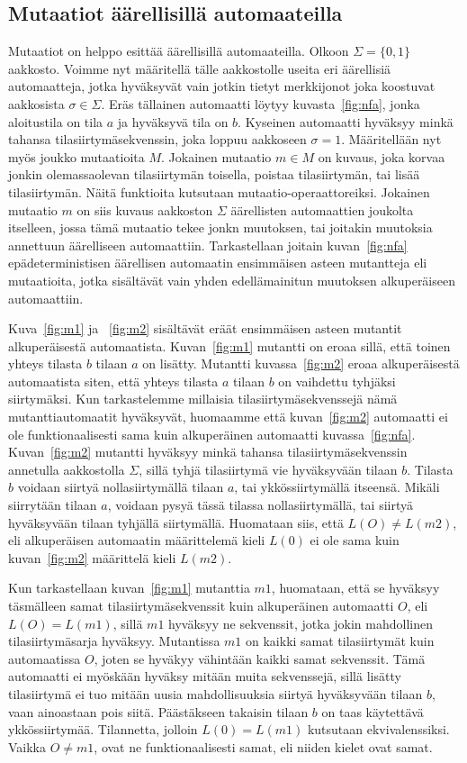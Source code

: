 \documentclass{tktltiki}
\begin{document}
\subsection{Mutaatiot äärellisillä automaateilla}
Mutaatiot on helppo esittää äärellisillä automaateilla. Olkoon $\Sigma=\{0,1\}$ aakkosto. Voimme nyt määritellä tälle aakkostolle useita eri äärellisiä automaatteja, jotka hyväksyvät vain jotkin tietyt merkkijonot joka koostuvat aakkosista $\sigma \in \Sigma$. Eräs tällainen automaatti löytyy kuvasta~\ref{fig:nfa}, jonka aloitustila on tila $a$ ja hyväksyvä tila on $b$. Kyseinen automaatti hyväksyy minkä tahansa tilasiirtymäsekvenssin, joka loppuu aakkoseen $\sigma = 1$. Määritellään nyt myös joukko mutaatioita $M$. Jokainen mutaatio $m\in M$ on kuvaus, joka korvaa jonkin olemassaolevan tilasiirtymän toisella, poistaa tilasiirtymän, tai lisää tilasiirtymän. Näitä funktioita kutsutaan mutaatio-operaattoreiksi. Jokainen mutaatio $m$ on siis kuvaus aakkoston $\Sigma$ äärellisten automaattien joukolta itselleen, jossa tämä mutaatio tekee jonkn muutoksen, tai joitakin muutoksia annettuun äärelliseen automaattiin. Tarkastellaan joitain kuvan~\ref{fig:nfa} epädeterministisen äärellisen automaatin ensimmäisen asteen mutantteja eli mutaatioita, jotka sisältävät vain yhden edellämainitun muutoksen alkuperäiseen automaattiin. 

Kuva~\ref{fig:m1} ja ~\ref{fig:m2} sisältävät eräät ensimmäisen asteen mutantit alkuperäisestä automaatista. Kuvan~\ref{fig:m1} mutantti on eroaa sillä, että toinen yhteys tilasta $b$ tilaan $a$ on lisätty. Mutantti kuvassa~\ref{fig:m2} eroaa alkuperäisestä automaatista siten, että yhteys tilasta $a$ tilaan $b$ on vaihdettu tyhjäksi siirtymäksi. Kun tarkastelemme millaisia tilasiirtymäsekvenssejä nämä mutanttiautomaatit hyväksyvät, huomaamme että kuvan~\ref{fig:m2} automaatti ei ole funktionaalisesti sama kuin alkuperäinen automaatti kuvassa~\ref{fig:nfa}. Kuvan~\ref{fig:m2} mutantti hyväksyy minkä tahansa tilasiirtymäsekvenssin annetulla aakkostolla $\Sigma$, sillä tyhjä tilasiirtymä vie hyväksyvään tilaan $b$. Tilasta $b$ voidaan siirtyä nollasiirtymällä tilaan $a$, tai ykkössiirtymällä itseensä. Mikäli siirrytään tilaan $a$, voidaan pysyä tässä tilassa nollasiirtymällä, tai siirtyä hyväksyvään tilaan tyhjällä siirtymällä. Huomataan siis, että $L(O) \neq L(m2)$, eli alkuperäisen automaatin määrittelemä kieli $L(0)$ ei ole sama kuin kuvan~\ref{fig:m2} määrittelä kieli $L(m2)$.

Kun tarkastellaan kuvan~\ref{fig:m1} mutanttia $m1$, huomataan, että se hyväksyy täsmälleen samat tilasiirtymäsekvenssit kuin alkuperäinen automaatti $O$, eli $L(O) = L(m1)$, sillä $m1$ hyväksyy ne sekvenssit, jotka jokin mahdollinen tilasiirtymäsarja hyväksyy. Mutantissa $m1$ on kaikki samat tilasiirtymät kuin automaatissa $O$, joten se hyväkyy vähintään kaikki samat sekvenssit. Tämä automaatti ei myöskään hyväksy mitään muita sekvenssejä, sillä lisätty tilasiirtymä ei tuo mitään uusia mahdollisuuksia siirtyä hyväksyvään tilaan $b$, vaan ainoastaan pois siitä. Päästäkseen takaisin tilaan $b$ on taas käytettävä ykkössiirtymää. Tilannetta, jolloin $L(0) = L(m1)$ kutsutaan ekvivalenssiksi. Vaikka $O \neq m1$, ovat ne funktionaalisesti samat, eli niiden kielet ovat samat. 
 
\end{document}
